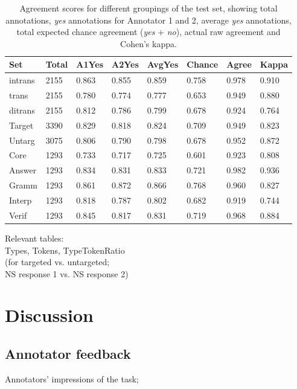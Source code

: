 \documentclass[11pt,a4paper]{article}
\begin{document}
\begin{table}[t!]
\begin{center}
\begin{tabular}{|l|l|l|l|l|l|l|l|}
\hline
Set	& Total	& A1Yes & A2Yes & AvgYes & Chance & Agree & Kappa \\
\hline
\hline
intrans & 2155 & 0.863 & 0.855 & 0.859 & 0.758 & 0.978 & 0.910 \\
\hline
trans & 2155 & 0.780 & 0.774 & 0.777 & 0.653 & 0.949 & 0.880 \\
\hline
ditrans & 2155 & 0.812 & 0.786 & 0.799 & 0.678 & 0.924 & 0.764 \\ 
\hline
\hline
Target & 3390 & 0.829 & 0.818 & 0.824 & 0.709 & 0.949 & 0.823 \\
\hline
Untarg & 3075 & 0.806 & 0.790 & 0.798 & 0.678 & 0.952 & 0.872 \\
\hline
\hline
Core & 1293 & 0.733 & 0.717 & 0.725 & 0.601 & 0.923 & 0.808 \\
\hline
Answer & 1293 & 0.834 & 0.831 & 0.833 & 0.721 & 0.982 & 0.936 \\
\hline
Gramm & 1293 & 0.861 & 0.872 & 0.866 & 0.768 & 0.960 & 0.827 \\
\hline
Interp & 1293 & 0.818 & 0.787 & 0.802 & 0.682 & 0.919 & 0.744 \\
\hline
Verif & 1293 & 0.845 & 0.817 & 0.831 & 0.719 & 0.968 & 0.884 \\
\hline
\end{tabular}
\caption{\label{tab:agreement} Agreement scores for different groupings of the test set, showing total annotations, \textit{yes} annotations for Annotator 1 and 2, average \textit{yes} annotations, total expected chance agreement (\textit{yes} + \textit{no}), actual raw agreement and Cohen's kappa.}
\end{center}
\end{table}

\smallskip

Relevant tables:\\
Types, Tokens, TypeTokenRatio \\
(for targeted vs. untargeted; \\
NS response 1 vs. NS response 2) \\

\section{Discussion}

\subsection{Annotator feedback}
Annotators' impressions of the task; 
\end{document}
